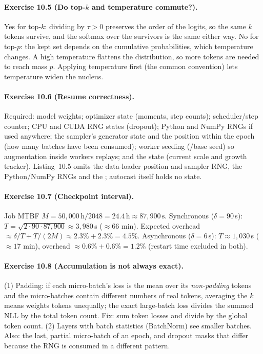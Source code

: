 \paragraph{Exercise 10.5 (Do top-$k$ and temperature commute?).}
Yes for top-$k$: dividing by $\tau>0$ preserves the order of the logits, so the same $k$ tokens
survive, and the softmax over the survivors is the same either way. No for top-$p$: the kept set
depends on the cumulative probabilities, which temperature changes. A high temperature flattens
the distribution, so more tokens are needed to reach mass $p$. Applying temperature first (the
common convention) lets temperature widen the nucleus.

\paragraph{Exercise 10.6 (Resume correctness).}
Required: model weights; optimizer state (moments, step counts); scheduler/step counter; CPU and
CUDA RNG states (dropout); Python  and NumPy RNGs if used anywhere; the sampler's
generator state and the position within the epoch (how many batches have been consumed); worker
seeding (/base seed) so augmentation inside workers replays; and the
 state (current scale and growth tracker). Listing~10.5 omits the data-loader
position and sampler RNG, the Python/NumPy RNGs and the ; autocast itself holds
no state.

\paragraph{Exercise 10.7 (Checkpoint interval).}
Job MTBF $M=50{,}000\,\text{h}/2048=24.4\,\text{h}\approx87{,}900\,\text{s}$.
Synchronous ($\delta=90$\,s): $T=\sqrt{2\cdot90\cdot87{,}900}\approx3{,}980$\,s ($\approx66$ min).
Expected overhead $\approx\delta/T+T/(2M)\approx2.3\%+2.3\%=4.5\%$.
Asynchronous ($\delta=6$\,s): $T\approx1{,}030$\,s ($\approx17$ min), overhead
$\approx0.6\%+0.6\%=1.2\%$ (restart time excluded in both).

\paragraph{Exercise 10.8 (Accumulation is not always exact).}
(1) Padding: if each micro-batch's loss is the mean over its \emph{non-padding} tokens and the
micro-batches contain different numbers of real tokens, averaging the $k$ means weights tokens
unequally; the exact large-batch loss divides the summed NLL by the total token count. Fix: sum
token losses and divide by the global token count. (2) Layers with batch statistics (BatchNorm)
see smaller batches. Also: the last, partial micro-batch of an epoch, and dropout masks that
differ because the RNG is consumed in a different pattern.

